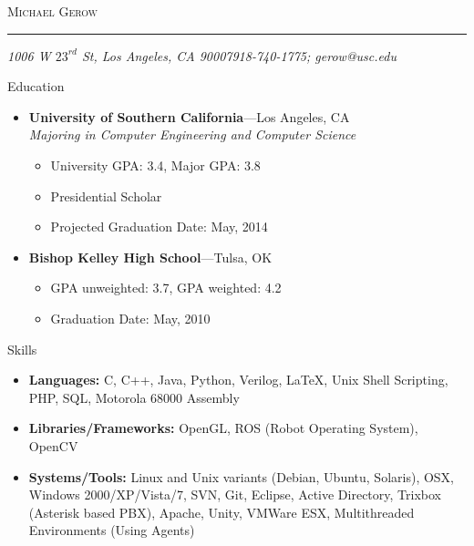 \documentclass[10pt,oneside]{article}
\makeatletter
\newcommand{\name}{Michael Gerow}
\newcommand{\addr}{1006 W $23^{rd}$ St, Los Angeles, CA 90007}
\newcommand{\phone}{918-740-1775}
\newcommand{\email}{gerow@usc.edu}
\newcommand{\bigname}[1]{
	\begin{center}\fontfamily{phv}\selectfont\Huge\scshape#1\end{center}
}
\newenvironment{ressection}[1]{
	\vspace{4pt}
	{\fontfamily{phv}\selectfont\Large#1}
	\begin{itemize}
	\vspace{3pt}
}{
	\end{itemize}
}
\newcommand{\resitem}[1]{
	\vspace{-4pt}
	\item \begin{flushleft} #1 \end{flushleft}
}
\newcommand{\ressubitem}[1]{
	\vspace{-1pt}
	\item \begin{flushleft} #1 \end{flushleft}
}
\newcommand{\resbigitem}[3]{
	\vspace{-5pt}
	\item
	\textbf{#1}---#2 \\
	\textit{#3}
}
\newcommand{\resshortbigitem}[2]{
	\vspace{-5pt}
	\item
	\textbf{#1}---#2
}
\newenvironment{ressubsec}[3]{
	\resbigitem{#1}{#2}{#3}
	\vspace{-2pt}
	\begin{itemize}
}{
	\end{itemize}
}
\newenvironment{resshortsubsec}[2]{
	\resshortbigitem{#1}{#2}
	\vspace{-2pt}
	\begin{itemize}
}{
	\end{itemize}
}
\makeatother
\begin{document}
 \selectfont

\bigname{\name}

\vspace{-8pt} \rule{\textwidth}{1pt}

\vspace{-1pt} {\small\itshape \addr \hfill \phone; \email}

\vspace{8 pt}




\begin{ressection}{Education}

	\begin{ressubsec}{University of Southern California}{Los Angeles, CA}{Majoring in Computer Engineering and Computer Science}
		\ressubitem{University GPA:  3.4, Major GPA: 3.8}
		\ressubitem{Presidential Scholar}
		\ressubitem{Projected Graduation Date:  May, 2014}
	\end{ressubsec}
	\begin{resshortsubsec}{Bishop Kelley High School}{Tulsa, OK}{}
		\ressubitem{GPA unweighted: 3.7, GPA weighted: 4.2}
		\ressubitem{Graduation Date: May, 2010}
	\end{resshortsubsec}

\end{ressection}

\begin{ressection}{Skills}

	\resitem{\textbf{Languages:} C, C++, Java, Python, Verilog, \LaTeX, Unix Shell Scripting, PHP, SQL, Motorola 68000 Assembly }
	\resitem{\textbf{Libraries/Frameworks:} OpenGL, ROS (Robot Operating System), OpenCV }
	\resitem{\textbf{Systems/Tools:} Linux and Unix variants (Debian, Ubuntu, Solaris), OSX, Windows 2000/XP/Vista/7, SVN, Git, Eclipse, Active Directory, Trixbox (Asterisk based PBX), Apache, Unity, VMWare ESX, Multithreaded Environments (Using Agents) }
	
\end{ressection}


\end{document}
